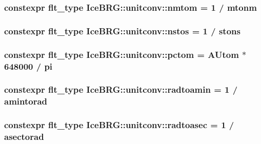 \subsubsection[{nmtom}]{\setlength{\rightskip}{0pt plus 5cm}constexpr {\bf flt\+\_\+type} Ice\+B\+R\+G\+::unitconv\+::nmtom = 1 / {\bf mtonm}}\label{namespaceIceBRG_1_1unitconv_aae0bf919fb6de8ed11bac8da359c8581}
\hypertarget{namespaceIceBRG_1_1unitconv_a855184b193ccc5390e79834b3ebfd673}{}
\subsubsection[{nstos}]{\setlength{\rightskip}{0pt plus 5cm}constexpr {\bf flt\+\_\+type} Ice\+B\+R\+G\+::unitconv\+::nstos = 1 / {\bf stons}}\label{namespaceIceBRG_1_1unitconv_a855184b193ccc5390e79834b3ebfd673}
\hypertarget{namespaceIceBRG_1_1unitconv_a9b7cf59666fcd20b97a7f8d2048b3062}{}
\subsubsection[{pctom}]{\setlength{\rightskip}{0pt plus 5cm}constexpr {\bf flt\+\_\+type} Ice\+B\+R\+G\+::unitconv\+::pctom = {\bf A\+Utom} $\ast$ 648000 / {\bf pi}}\label{namespaceIceBRG_1_1unitconv_a9b7cf59666fcd20b97a7f8d2048b3062}
\hypertarget{namespaceIceBRG_1_1unitconv_a17f1d967b18ef4f253e34b937503faad}{}
\subsubsection[{radtoamin}]{\setlength{\rightskip}{0pt plus 5cm}constexpr {\bf flt\+\_\+type} Ice\+B\+R\+G\+::unitconv\+::radtoamin = 1 / {\bf amintorad}}\label{namespaceIceBRG_1_1unitconv_a17f1d967b18ef4f253e34b937503faad}
\hypertarget{namespaceIceBRG_1_1unitconv_a09a2034ad6ab76378b92efbd0ad5b137}{}
\subsubsection[{radtoasec}]{\setlength{\rightskip}{0pt plus 5cm}constexpr {\bf flt\+\_\+type} Ice\+B\+R\+G\+::unitconv\+::radtoasec = 1 / {\bf asectorad}}\label{namespaceIceBRG_1_1unitconv_a09a2034ad6ab76378b92efbd0ad5b137}
\hypertarget{namespaceIceBRG_1_1unitconv_a4d3abf3e99716b322bf8ec50f6a753aa}{}
